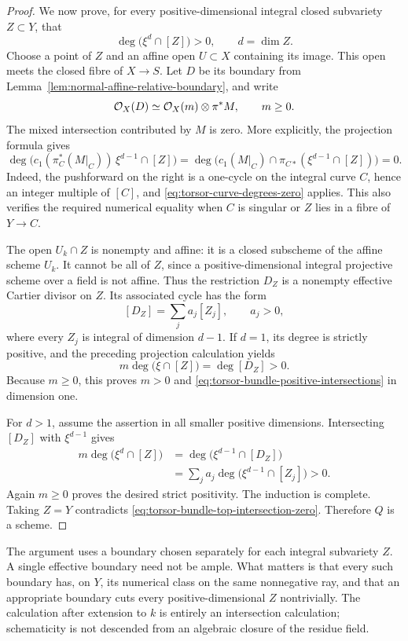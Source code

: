 \begin{proof}
We now prove, for every positive-dimensional integral closed
subvariety $Z\subset Y$, that
\begin{equation}\label{eq:torsor-bundle-positive-intersections}
 \deg\bigl(\xi^d\cap[Z]\bigr)>0,
 \qquad d=\dim Z.
\end{equation}
Choose a point of $Z$ and an affine open $U\subset X$ containing
its image. This open meets the closed fibre of $X\to S$.
Let $D$ be its boundary from
Lemma~\ref{lem:normal-affine-relative-boundary}, and write
\[
 \mathcal O_X(D)\simeq\mathcal O_X(m)\otimes\pi^*M,
 \qquad m\geq0.
\]
The mixed intersection contributed by $M$ is zero. More explicitly,
the projection formula gives
\[
 \deg\bigl(c_1(\pi_C^*(M|_C))\,\xi^{d-1}\cap[Z]\bigr)
 =\deg\bigl(c_1(M|_C)\cap
       \pi_{C*}(\xi^{d-1}\cap[Z])\bigr)=0.
\]
Indeed, the pushforward on the right is a one-cycle on the integral
curve $C$, hence an integer multiple of $[C]$, and
\eqref{eq:torsor-curve-degrees-zero} applies. This also verifies the
required numerical equality when $C$ is singular or $Z$ lies in
a fibre of $Y\to C$.

The open $U_k\cap Z$ is nonempty and affine: it is a closed
subscheme of the affine scheme $U_k$. It cannot be all of $Z$, since
a positive-dimensional integral projective scheme over a field is
not affine. Thus the restriction $D_Z$ is a nonempty effective
Cartier divisor on $Z$. Its associated cycle has the form
\[
 [D_Z]=\sum_j a_j[Z_j],\qquad a_j>0,
\]
where every $Z_j$ is integral of dimension $d-1$.
If $d=1$, its degree is strictly positive, and the preceding
projection calculation yields
\[
 m\deg\bigl(\xi\cap[Z]\bigr)=\deg[D_Z]>0.
\]
Because $m\geq0$, this proves $m>0$ and
\eqref{eq:torsor-bundle-positive-intersections} in dimension one.

For $d>1$, assume the assertion in all smaller positive dimensions.
Intersecting $[D_Z]$ with $\xi^{d-1}$ gives
\[
 \begin{split}
 m\deg\bigl(\xi^d\cap[Z]\bigr)
  &=\deg\bigl(\xi^{d-1}\cap[D_Z]\bigr)\\
  &=\sum_j a_j\deg\bigl(\xi^{d-1}\cap[Z_j]\bigr)>0.
 \end{split}
\]
Again $m\geq0$ proves the desired strict positivity. The induction
is complete. Taking $Z=Y$ contradicts
\eqref{eq:torsor-bundle-top-intersection-zero}.
Therefore $Q$ is a scheme.
\end{proof}

The argument uses a boundary chosen separately for each integral
subvariety $Z$. A single effective boundary need not be ample.
What matters is that every such boundary has, on $Y$, its numerical
class on the same nonnegative ray, and that an appropriate boundary
cuts every positive-dimensional $Z$ nontrivially. The calculation
after extension to $k$ is entirely an intersection calculation;
schematicity is not descended from an algebraic closure of the
residue field.

